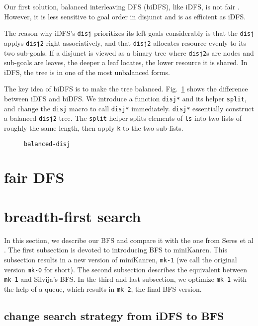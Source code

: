 \documentclass[format=acmlarge, review=true, authordraft=true]{acmart}
\begin{document}
Our first solution, balanced interleaving DFS (biDFS), like iDFS, is not fair . However, it is less sensitive to goal order in disjunct and is as efficient as iDFS. 

The reason why iDFS's \texttt{disj} prioritizes its left goals considerably is that the \texttt{disj} applys \texttt{disj2} right associatively, and that 
\texttt{disj2} allocates resource evenly to its two sub-goals. If a disjunct 
is viewed as a binary tree where \texttt{disj2}s are nodes and sub-goals are 
leaves, the deeper a leaf locates, the lower resource it is shared. In iDFS, the tree is in one of the most unbalanced forms. 

The key idea of biDFS is to make the tree balanced. Fig.~\ref{balanced-disj} shows the difference between iDFS and biDFS. We introduce a function \texttt{disj*} and its helper \texttt{split}, and change the \texttt{disj} macro to call \texttt{disj*} immediately. \texttt{disj*} essentially construct a balanced \texttt{disj2} tree. The \texttt{split} helper splits elements of \texttt{ls} into two lists of roughly the same length, then apply \texttt{k} to the two sub-lists.

\begin{figure}
  
  \caption{\texttt{balanced-disj}}
  \label{balanced-disj}
\end{figure}

\section{fair DFS}

\section{breadth-first search}

In this section, we describe our BFS and compare it with the one from Seres et 
al \citep{seres1999algebra}. The first subsection is devoted to introducing BFS to miniKanren. This subsection results in a new version of miniKanren, \texttt{mk-1} (we call the original version \texttt{mk-0} for short). The second subsection describes the equivalent between \texttt{mk-1} and Silvija's BFS. In the third and last subsection, we optimize \texttt{mk-1} with the help of a queue, which results in \texttt{mk-2}, the final BFS version.

\subsection{change search strategy from iDFS to BFS}
\end{document}
